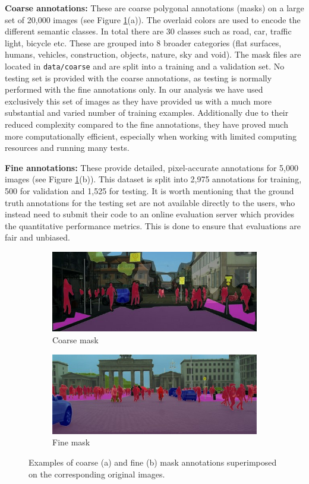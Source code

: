 \textbf{Coarse annotations:} These are coarse polygonal annotations (masks) on a large set of 20,000 images (see Figure \ref{fig:cityscapes}(a)). The overlaid colors are used to encode the different semantic classes. In total there are 30 classes such as road, car, traffic light, bicycle etc. These are grouped into 8 broader categories (flat surfaces, humans, vehicles, construction, objects, nature, sky and void). The mask files are located in \small\texttt{data/coarse} and are split into a training and a validation set. No testing set is provided with the coarse annotations, as testing is normally performed with the fine annotations only. In our analysis we have used exclusively this set of images as they have provided us with a much more substantial and varied number of training examples. Additionally due to their reduced complexity compared to the fine annotations, they have proved much more computationally efficient, especially when working with limited computing resources and running many tests.

\textbf{Fine annotations:} These provide detailed, pixel-accurate annotations for 5,000 images (see Figure \ref{fig:cityscapes}(b)). This dataset is split into 2,975 annotations for training, 500 for validation and 1,525 for testing. It is worth mentioning that the ground truth annotations for the testing set are not available directly to the users, who instead need to submit their code to an online evaluation server which provides the quantitative performance metrics. This is done to ensure that evaluations are fair and unbiased.

\begin{figure}[ht]
	\begin{subfigure}{.5\textwidth}
		\includegraphics[width=\textwidth]{coarse_example.jpg}
		\caption{Coarse mask}
	\end{subfigure}
	\begin{subfigure}{.5\textwidth}
		\includegraphics[width=\textwidth]{fine_example.jpg}
		\caption{Fine mask}
	\end{subfigure}
	\caption{Examples of coarse (a) and fine (b) mask annotations superimposed on the corresponding original images.}
	\label{fig:cityscapes}
\end{figure}

